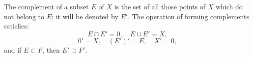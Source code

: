 The complement of a subset $E$ of $X$ is the set of all those points of $X$ which do not belong to $E$; it will be denoted by $E'$. The operation of forming complements satisfies:
$$E \cap E' = 0, \quad E \cup E' = X,$$
$$0' = X, \quad (E')' = E, \quad X' = 0,$$
and if $E \subset F$, then $E' \supset F'$.
